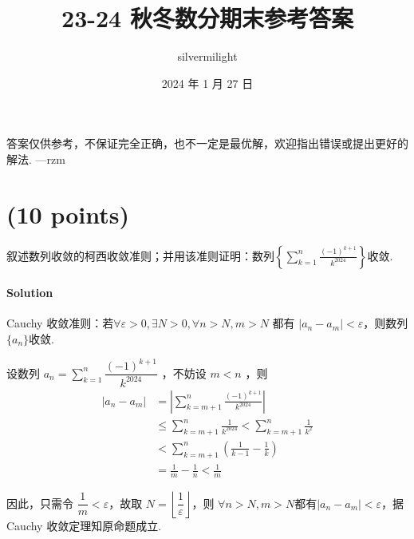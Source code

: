 \documentclass{ctexart}
\title{23-24 秋冬数分期末参考答案}
\author{silvermilight}
\date{2024 年 1 月 27 日}
\begin{document}
\maketitle

答案仅供参考，不保证完全正确，也不一定是最优解，欢迎指出错误或提出更好的解法. ---rzm

\section{(10 points)}
    叙述数列收敛的柯西收敛准则；并用该准则证明：数列$\displaystyle\left\{\sum_{k=1}^n \frac{(-1)^{k+1}}{k^{2024}}\right\}$收敛.
\paragraph{Solution}
    Cauchy 收敛准则：若$\forall\varepsilon>0,\exists N>0,\forall n>N,m>N $ 都有 $|a_n-a_m|<\varepsilon$，则数列$\{a_n\}$收敛.

    设数列 $a_n=\displaystyle\sum_{k=1}^n \dfrac{(-1)^{k+1}}{k^{2024}}$ ，不妨设 $m<n$ ，则
    \begin{align*}
        |a_n-a_m| &= \left| \sum_{k=m+1}^n \frac{(-1)^{k+1}}{k^{2024}} \right| \\
                    & \leqslant \sum_{k=m+1}^n \frac{1}{k^{2024}} < \sum_{k=m+1}^n \frac{1}{k^2} \\
                    & < \sum_{k=m+1}^n \left( \frac{1}{k-1}-\frac{1}{k} \right) \\
                    & = \frac{1}{m}-\frac{1}{n} < \frac{1}{m}
    \end{align*}

    因此，只需令 $\dfrac{1}{m}<\varepsilon$，故取 $N=\left\lfloor \dfrac{1}{\varepsilon} \right\rfloor$，则 $\forall n>N,m>N$都有$|a_n-a_m|<\varepsilon$，据 Cauchy 收敛定理知原命题成立.
\end{document}
